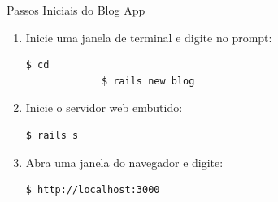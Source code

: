 \begin{frame}{Passos Iniciais do Blog App}
	\begin{enumerate}
	    \item Inicie uma janela de terminal e digite no prompt:
	     \begin{lstlisting}[style=BashInputBasicStyle]
		     $ cd 
		     $ rails new blog
	     \end{lstlisting}
%	    
	     \item Inicie o servidor web embutido:
	     \begin{lstlisting}[style=BashInputBasicStyle]
	     $ rails s
	     \end{lstlisting}
	     
	     \item Abra uma janela do navegador e digite:
	     \begin{lstlisting}[style=BashInputBasicStyle]
	     $ http://localhost:3000
	     \end{lstlisting}
	\end{enumerate}
  
\end{frame}
